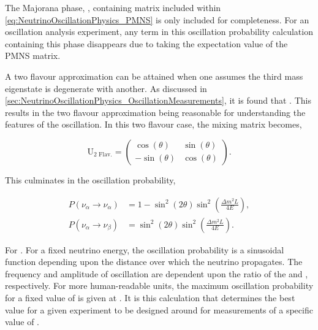 The Majorana phase, , containing matrix included within \autoref{eq:NeutrinoOscillationPhysics_PMNS} is only included for completeness. For an oscillation analysis experiment, any term in this oscillation probability calculation containing this phase disappears due to taking the expectation value of the PMNS matrix.

A two flavour approximation can be attained when one assumes the third mass eigenstate is degenerate with another. As discussed in \autoref{sec:NeutrinoOscillationPhysics_OscillationMeasurements}, it is found that . This results in the two flavour approximation being reasonable for understanding the features of the oscillation. In this two flavour case, the mixing matrix becomes,

\begin{equation}
  \label{eq:NeutrinoOscillationPhysics_PMNS_2Flavour}
  \mathrm{U_{\text{2 Flav.}}} = \begin{pmatrix} \cos(\theta) & \sin(\theta) \\ -\sin(\theta) & \cos(\theta) \end{pmatrix}.
\end{equation}

This culminates in the oscillation probability,

\begin{equation}
  \label{eq:NeutrinoOscillationPhysics_PMNS_2FlavourOscProb}
  \begin{split}
  P(\nu_{\alpha} \rightarrow \nu_{\alpha}) &= 1 - \sin^{2} \left( 2\theta \right) \sin^2 \left( \frac{\Delta m^{2} L}{4E} \right), \\
  P(\nu_{\alpha} \rightarrow \nu_{\beta}) &= \sin^{2} \left( 2\theta \right) \sin^2 \left( \frac{\Delta m^{2} L}{4E} \right).
  \end{split}
\end{equation}

For \quickmath{\alpha \neq \beta}. For a fixed neutrino energy, the oscillation probability is a sinusoidal function depending upon the distance over which the neutrino propagates. The frequency and amplitude of oscillation are dependent upon the ratio of the  and , respectively. For more human-readable units, the maximum oscillation probability for a fixed value of \quickmath{\theta} is given at . It is this calculation that determines the best  value for a given experiment to be designed around for measurements of a specific value of .

